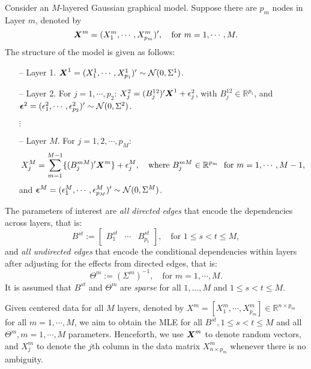 Consider an $M$-layered Gaussian graphical model. Suppose there are $p_m$ nodes in Layer $m$, denoted by 
\begin{equation*}
\boldsymbol{X}^m=(X^m_1,\cdots,X^m_{p_m})', \quad \text{for }m=1,\cdots,M.
\end{equation*}
The structure of the model is given as follows: 
\begin{itemize}
\item[--] Layer 1. $\boldsymbol{X}^1=(X^1_1,\cdots,X^1_{p_1})'\sim \mathcal{N}(0,\Sigma^1)$.
\item[--] Layer 2. For $j=1,\cdots,p_2$: $X^2_j=(B^{12}_j)'\boldsymbol{X}^1 + \epsilon_j^2$, with $B^{12}_j\in\mathbb{R}^{p_1}$, and $\boldsymbol{\epsilon}^2 = (\epsilon^2_1,\cdots,\epsilon^2_{p_2})'\sim \mathcal{N}(0,\Sigma^2)$.
\item[ ] $\vdots$
\item[--] Layer $M$. For $j=1,2,\cdots,p_M$: 
\begin{equation*}
X^M_j = \sum_{m=1}^{M-1} \{(B^{mM}_j)'\boldsymbol{X}^m \}+ \epsilon_j^M, \quad \text{where }B^{mM}_j\in\mathbb{R}^{p_m}~~\text{for }m=1,\cdots,M-1,
\end{equation*}
and $\boldsymbol{\epsilon}^M=(\epsilon^M_1,\cdots,\epsilon^M_{p_M})'\sim\mathcal{N}(0,\Sigma^M)$.
\end{itemize}
The parameters of interest are {\em all directed edges} that encode the dependencies across layers, that is:
\begin{equation*}
B^{st} := \begin{bmatrix}B^{st}_1 & \cdots & B^{st}_{p_t}\end{bmatrix}, \quad \text{for } 1\leq s < t \leq M,
\end{equation*}
and {\em all undirected edges} that encode the conditional dependencies within layers after adjusting for the effects from directed edges, that is:
\begin{equation*}
\Theta^m := (\Sigma^m)^{-1}, \quad \text{for }m=1,\cdots,M.
\end{equation*}
It is assumed that $B^{st}$ and $\Theta^m$ are {\em sparse} for all $1,\dotsc, M$ and $1\leq s < t\leq M$.

Given centered data for all $M$ layers, denoted by $X^m=[X_1^m,\cdots,X^m_{p_m}]\in\mathbb{R}^{n\times p_m}$ for all $m=1,\cdots,M$, we aim to obtain the MLE for all $B^{st},1\leq s<t\leq M$ and all $\Theta^m,m=1,\cdots,M$ parameters. Henceforth, we use $\boldsymbol{X}^m$ to denote random vectors, and $X_j^m$ to denote the $j$th column in the data matrix $X_{n \times p_m}^m$ whenever there is no ambiguity. 

